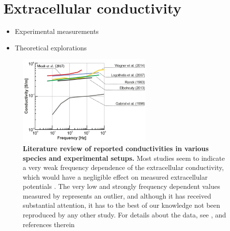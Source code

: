 \section{Extracellular conductivity}
\label{sec:conductivity}

\begin{itemize}
\item Experimental measurements \citep{Miceli2017}
\item Theoretical explorations \citep{Meffin2012,Tahayori2012,Meffin2014,Tahayori2014}
\end{itemize}

\begin{figure}[!ht]
\begin{center}
\includegraphics[width=0.6\textwidth]{Figures/frequency_dependence.png}
\end{center}
\caption{\textbf{Literature review of reported conductivities in various species and experimental setups.} 
Most studies seem to indicate a very weak frequency dependence of the extracellular conductivity, which would have a negligible effect on measured extracellular potentials \citep{Miceli2017}. The very low and strongly frequency dependent values measured by \cite{Gabriel1996} represents an outlier, and although it has received substantial attention, it has to the best of our knowledge not been reproduced by any other study.
For details about the data, see \cite{Miceli2017}, and references therein \citep{Ranck1963, Gabriel1996, Logothetis2007, Elbohouty2013, Wagner2014}
}
\label{fig:freq_dep}
\end{figure}


